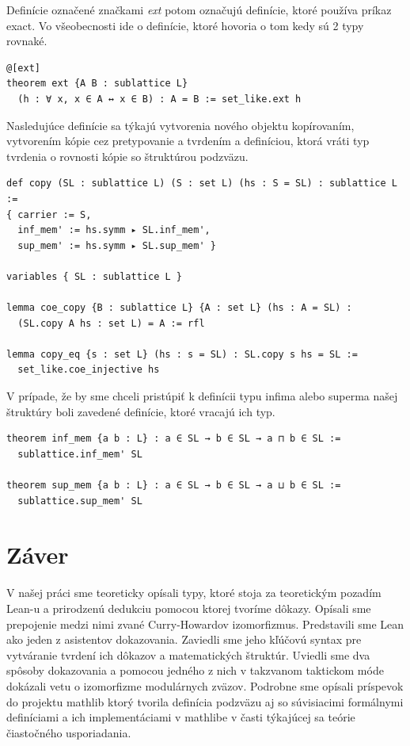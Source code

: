 \documentclass[a4paper,10pt,oneside]{report}%
\begin{document}
    Definície označené značkami \emph{ext} potom označujú definície, ktoré
používa príkaz exact. Vo všeobecnosti ide o definície, ktoré hovoria o tom
kedy sú 2 typy rovnaké.
\begin{lstlisting}
@[ext]
theorem ext {A B : sublattice L}
  (h : ∀ x, x ∈ A ↔ x ∈ B) : A = B := set_like.ext h
\end{lstlisting}
    Nasledujúce definície sa týkajú vytvorenia nového objektu kopírovaním,
vytvorením kópie cez pretypovanie a tvrdením a definíciou, ktorá vráti typ
tvrdenia o rovnosti kópie so štruktúrou podzväzu.
\begin{lstlisting}
def copy (SL : sublattice L) (S : set L) (hs : S = SL) : sublattice L :=
{ carrier := S,
  inf_mem' := hs.symm ▸ SL.inf_mem',
  sup_mem' := hs.symm ▸ SL.sup_mem' }

variables { SL : sublattice L }

lemma coe_copy {B : sublattice L} {A : set L} (hs : A = SL) :
  (SL.copy A hs : set L) = A := rfl

lemma copy_eq {s : set L} (hs : s = SL) : SL.copy s hs = SL :=
  set_like.coe_injective hs
\end{lstlisting}
    V prípade, že by sme chceli pristúpiť k definícii typu infima alebo superma
našej štruktúry boli zavedené definície, ktoré vracajú ich typ.
\begin{lstlisting}
theorem inf_mem {a b : L} : a ∈ SL → b ∈ SL → a ⊓ b ∈ SL :=
  sublattice.inf_mem' SL

theorem sup_mem {a b : L} : a ∈ SL → b ∈ SL → a ⊔ b ∈ SL :=
  sublattice.sup_mem' SL
\end{lstlisting}

\chapter{Záver}

    V našej práci sme teoreticky opísali typy, ktoré stoja za teoretickým pozadím
Lean-u a prirodzenú dedukciu pomocou ktorej tvoríme dôkazy.
    Opísali sme prepojenie medzi nimi zvané Curry-Howardov izomorfizmus.
    Predstavili sme Lean ako jeden z asistentov dokazovania.
    Zaviedli sme jeho kľúčovú syntax pre vytváranie tvrdení ich dôkazov a matematických
štruktúr.
    Uviedli sme dva spôsoby dokazovania a pomocou jedného z nich v takzvanom taktickom
móde dokázali vetu o izomorfizme modulárnych zväzov.
    Podrobne sme opísali príspevok do projektu mathlib ktorý tvorila
definícia podzväzu aj so súvisiacimi formálnymi definíciami a ich implementáciami
v mathlibe v časti týkajúcej sa teórie čiastočného usporiadania.
\end{document}
